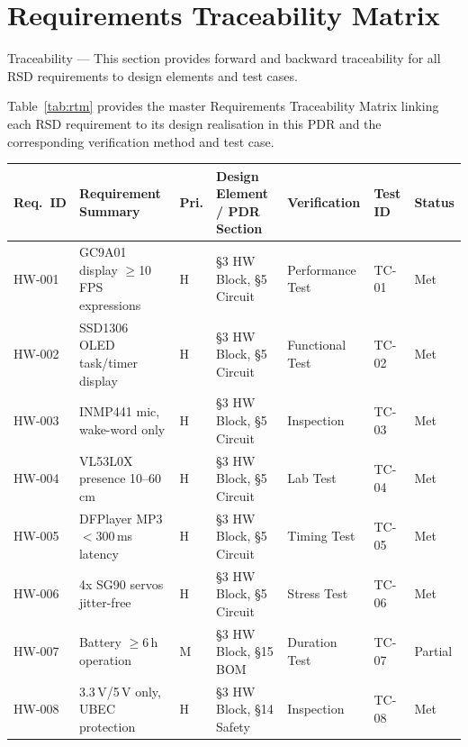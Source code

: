 \documentclass[12pt,a4paper]{article}
\begin{document}
\section{Requirements Traceability Matrix}

\begin{tracebox}
Traceability --- This section provides forward and backward traceability
for all RSD requirements to design elements and test cases.
\end{tracebox}

\vspace{0.3cm}

Table~\ref{tab:rtm} provides the master Requirements Traceability Matrix
linking each RSD requirement to its design realisation in this PDR and
the corresponding verification method and test case.

\begin{center}
\scriptsize
{}
\label{tab:rtm}
\begin{tabular}{|C{0.07\textwidth}|L{0.22\textwidth}|C{0.04\textwidth}|L{0.22\textwidth}|L{0.13\textwidth}|C{0.06\textwidth}|C{0.08\textwidth}|}
\hline
\textbf{Req.~ID} & \textbf{Requirement Summary} & \textbf{Pri.} &
\textbf{Design Element / PDR Section} & \textbf{Verification} &
\textbf{Test ID} & \textbf{Status} \\ \hline
HW-001 & GC9A01 display $\geq$10\,FPS expressions & H &
\S3 HW Block, \S5 Circuit & Performance Test & TC-01 & Met \\ \hline
HW-002 & SSD1306 OLED task/timer display & H &
\S3 HW Block, \S5 Circuit & Functional Test & TC-02 & Met \\ \hline
HW-003 & INMP441 mic, wake-word only & H &
\S3 HW Block, \S5 Circuit & Inspection & TC-03 & Met \\ \hline
HW-004 & VL53L0X presence 10--60\,cm & H &
\S3 HW Block, \S5 Circuit & Lab Test & TC-04 & Met \\ \hline
HW-005 & DFPlayer MP3 $<$300\,ms latency & H &
\S3 HW Block, \S5 Circuit & Timing Test & TC-05 & Met \\ \hline
HW-006 & 4x SG90 servos jitter-free & H &
\S3 HW Block, \S5 Circuit & Stress Test & TC-06 & Met \\ \hline
HW-007 & Battery $\geq$6\,h operation & M &
\S3 HW Block, \S15 BOM & Duration Test & TC-07 & Partial \\ \hline
HW-008 & 3.3\,V/5\,V only, UBEC protection & H &
\S3 HW Block, \S14 Safety & Inspection & TC-08 & Met \\ \hline

\end{tabular}
\end{center}
\end{document}
